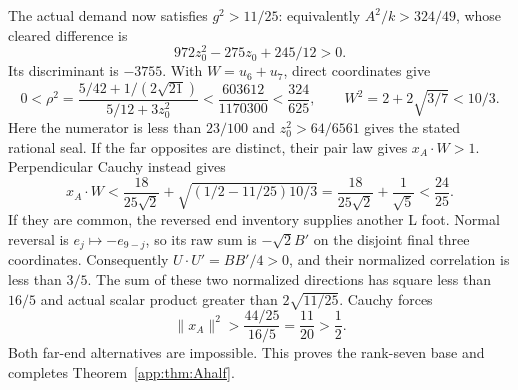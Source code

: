 \documentclass[11pt]{article}
\theoremstyle{definition}
\theoremstyle{remark}
\begin{document}
The actual demand now satisfies $g^2>11/25$: equivalently
$A^2/k>324/49$, whose cleared difference is
\[
 972z_0^2-275z_0+245/12>0.
\]
Its discriminant is $-3755$. With $W=u_6+u_7$, direct
coordinates give
\[
 0<\rho^2=
 \frac{5/42+1/(2\sqrt{21})}{5/12+3z_0^2}
 <\frac{603612}{1170300}<\frac{324}{625},
 \qquad W^2=2+2\sqrt{3/7}<10/3.
\]
Here the numerator is less than $23/100$ and
$z_0^2>64/6561$ gives the stated rational seal. If the far
opposites are distinct, their pair law gives $x_A\cdot W>1$.
Perpendicular Cauchy instead gives
\[
 x_A\cdot W<\frac{18}{25\sqrt2}
       +\sqrt{(1/2-11/25)10/3}
 =\frac{18}{25\sqrt2}+\frac1{\sqrt5}<\frac{24}{25}.
\]
If they are common, the reversed end inventory supplies another
L foot. Normal reversal is $e_j\mapsto-e_{9-j}$, so its raw
sum is $-\sqrt2B'$ on the disjoint final three coordinates.
Consequently $U\cdot U'=BB'/4>0$, and their normalized
correlation is less than $3/5$. The sum of these two normalized
directions has square less than $16/5$ and actual scalar product
greater than $2\sqrt{11/25}$. Cauchy forces
\[
 \|x_A\|^2>\frac{44/25}{16/5}=\frac{11}{20}>\frac12.
\]
Both far-end alternatives are impossible. This proves the
rank-seven base and completes Theorem~\ref{app:thm:Ahalf}.
\end{document}
